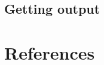 \documentclass[11pt]{article}
\begin{document}
    \subsection{Getting output}\label{subsec:getting-output}



    \section{References}\label{sec:references}

\end{document}
